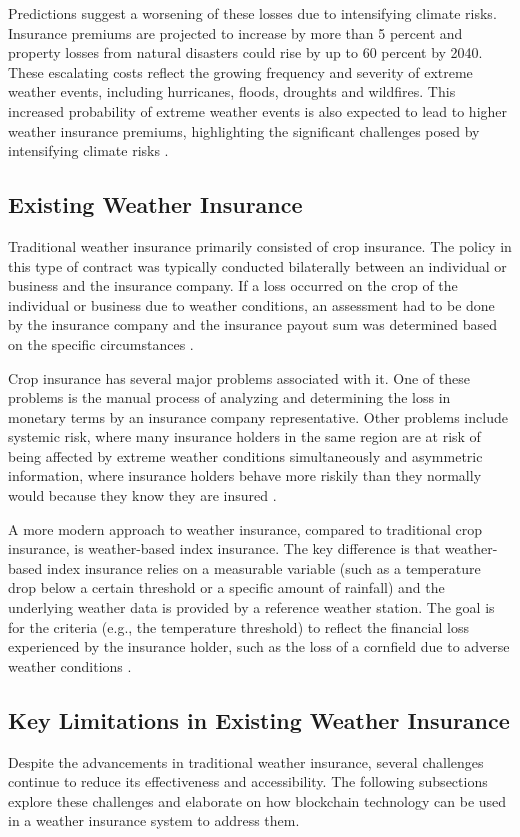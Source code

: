 Predictions suggest a worsening of these losses due to intensifying climate risks. Insurance premiums are projected to increase by more than 5 percent and property losses from natural disasters could rise by up to 60 percent by 2040. These escalating costs reflect the growing frequency and severity of extreme weather events, including hurricanes, floods, droughts and wildfires. This increased probability of extreme weather events is also expected to lead to higher weather insurance premiums, highlighting the significant challenges posed by intensifying climate risks \autocites{cho2022climate}{tucker1997climate}.

\subsection{Existing Weather Insurance}
Traditional weather insurance primarily consisted of crop insurance. The policy in this type of contract was typically conducted bilaterally between an individual or business and the insurance company. If a loss occurred on the crop of the individual or business due to weather conditions, an assessment had to be done by the insurance company and the insurance payout sum was determined based on the specific circumstances \autocite{michler2022risk}.

Crop insurance has several major problems associated with it. One of these problems is the manual process of analyzing and determining the loss in monetary terms by an insurance company representative. Other problems include systemic risk, where many insurance holders in the same region are at risk of being affected by extreme weather conditions simultaneously and asymmetric information, where insurance holders behave more riskily than they normally would because they know they are insured \autocite{makki2002crop}.

\sloppy A more modern approach to weather insurance, compared to traditional crop insurance, is weather-based index insurance. The key difference is that weather-based index insurance relies on a measurable variable (such as a temperature drop below a certain threshold or a specific amount of rainfall) and the underlying weather data is provided by a reference weather station. The goal is for the criteria (e.g., the temperature threshold) to reflect the financial loss experienced by the insurance holder, such as the loss of a cornfield due to adverse weather conditions \autocite{kajwang2022weather}.

\subsection{Key Limitations in Existing Weather Insurance}\label{section:key_limitations_existing_insurance}
Despite the advancements in traditional weather insurance, several challenges continue to reduce its effectiveness and accessibility. The following subsections explore these challenges and elaborate on how blockchain technology can be used in a weather insurance system to address them.

